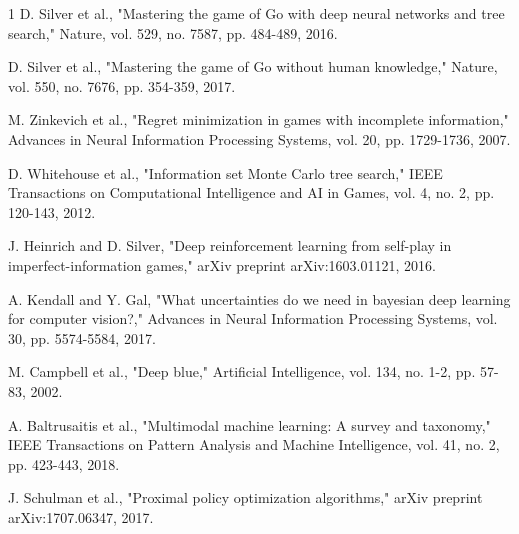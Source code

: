 \documentclass[conference]{IEEEtran}
\begin{document}
\begin{thebibliography}{1}
D. Silver et al., "Mastering the game of Go with deep neural networks and tree search," Nature, vol. 529, no. 7587, pp. 484-489, 2016.

D. Silver et al., "Mastering the game of Go without human knowledge," Nature, vol. 550, no. 7676, pp. 354-359, 2017.

M. Zinkevich et al., "Regret minimization in games with incomplete information," Advances in Neural Information Processing Systems, vol. 20, pp. 1729-1736, 2007.

D. Whitehouse et al., "Information set Monte Carlo tree search," IEEE Transactions on Computational Intelligence and AI in Games, vol. 4, no. 2, pp. 120-143, 2012.

J. Heinrich and D. Silver, "Deep reinforcement learning from self-play in imperfect-information games," arXiv preprint arXiv:1603.01121, 2016.

A. Kendall and Y. Gal, "What uncertainties do we need in bayesian deep learning for computer vision?," Advances in Neural Information Processing Systems, vol. 30, pp. 5574-5584, 2017.

M. Campbell et al., "Deep blue," Artificial Intelligence, vol. 134, no. 1-2, pp. 57-83, 2002.

A. Baltrusaitis et al., "Multimodal machine learning: A survey and taxonomy," IEEE Transactions on Pattern Analysis and Machine Intelligence, vol. 41, no. 2, pp. 423-443, 2018.

J. Schulman et al., "Proximal policy optimization algorithms," arXiv preprint arXiv:1707.06347, 2017.

\end{thebibliography}
\end{document}
